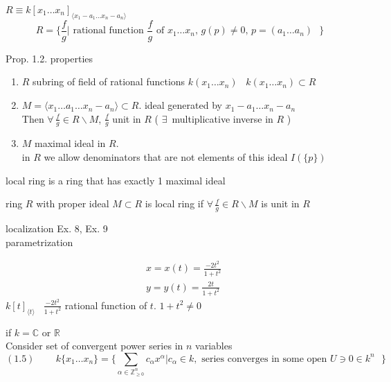 $R \equiv k[x_1 \dots x_n]_{\langle x_1 - a_1 \dots x_n-a_n \rangle }$ 
\[
R = \lbrace \frac{f}{g} | \text{ rational function $\frac{f}{g}$ of $x_1 \dots x_n$, $g(p) \neq 0$, $p=(a_1 \dots a_n) $ } \rbrace
\]

Prop. 1.2. properties 

\begin{enumerate}
\item[(a)] $R$ subring of field of rational functions $k(x_1 \dots x_n)$ \quad \, $k(x_1 \dots x_n) \subset R$ 
\item[(b)] $M = \langle x_1 \dots a_1 \dots x_n -a_n \rangle \subset R$.  ideal generated by $x_1 - a_1 \dots x_n-a_n$ \\
Then $\forall \, \frac{f}{g} \in R\backslash M$, $\frac{f}{g}$ unit in $R$ ( $\exists \, $ multiplicative inverse in $R$ )
\item[(c)] $M$ maximal ideal in $R$. \\
in $R$ we allow denominators that are not elements of this ideal $I(\lbrace p \rbrace)$ 
\end{enumerate}

\begin{definition}[1.3] local ring is a ring that has exactly 1 maximal ideal \end{definition}

\begin{proposition}[1.4] ring $R$ with proper ideal $M\subset R$ is local ring if $\forall \, \frac{f}{g} \in R\backslash M$ is unit in $R$
\end{proposition}

localization Ex. 8, Ex. 9 \\
parametrization

 \[
\begin{aligned}
  & x = x(t) = \frac{-2t^2 }{1+t^2} \\ 
 &  y = y(t) = \frac{2t}{1+t^2}
\end{aligned}
\]
$k[t]_{\langle t \rangle}$ \quad \, $\frac{-2t^2}{1+t^2}$ rational function of $t$.  $1+t^2 \neq 0$

if $k = \mathbb{C}$ or $\mathbb{R}$ \\

Consider set of convergent power series in $n$ variables \\

\begin{equation}
(1.5) \quad \quad \,   k\lbrace x_1 \dots x_n \rbrace = \lbrace \sum_{\alpha \in \mathbb{Z}^n_{\geq 0}} c_{\alpha} x^{\alpha} | c_{\alpha} \in k, \text{ series converges in some open $U\ni 0 \in k^n $ } \rbrace
\end{equation}


